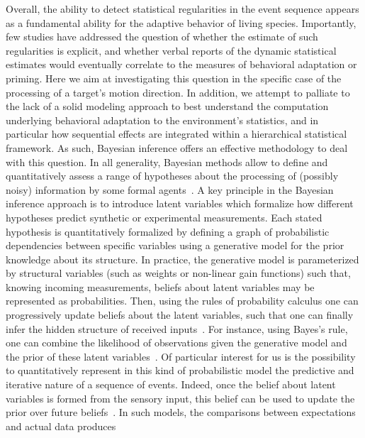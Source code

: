 \documentclass[12pt,english]{article}%
\newcommand{\citep}[1]{\parencite{#1}}
\begin{document}
Overall, the ability to detect
statistical regularities in the event sequence appears as a fundamental ability
for the adaptive behavior of living species.
Importantly, few studies have addressed the question of whether
the estimate of such regularities is explicit,
and whether verbal reports of the dynamic statistical
estimates would eventually correlate to the measures of behavioral adaptation or priming.
Here we aim at investigating this question
in the specific case of the  processing of a target's motion direction.
In addition, we attempt to palliate to the lack of a solid modeling approach
to best understand the computation underlying behavioral adaptation to the environment's statistics,
and in particular how sequential effects are integrated
within a hierarchical statistical framework.
As such, Bayesian inference offers an effective methodology
to deal with this question.
In all generality, Bayesian methods allow to define and quantitatively assess
a range of hypotheses about the processing of (possibly noisy) information by some formal agents~\citep{Deneve1999, Diaconescu2014, Daunizeau10a}.
A key principle in the Bayesian inference approach is
to introduce latent variables which formalize how different hypotheses predict synthetic or experimental measurements.
Each stated hypothesis is quantitatively formalized
by defining a graph of probabilistic dependencies between specific variables
using a generative model for the prior knowledge about its structure.
In practice, the generative model is parameterized by structural variables
(such as weights or non-linear gain functions)
such that, knowing incoming measurements, beliefs about latent variables
may be represented as probabilities.
Then, using the rules of probability calculus
one can progressively update beliefs about the latent variables,
such that one can finally infer the hidden structure of received inputs~\citep{Hoyer2003, Ma2014}.
For instance, using Bayes's rule, one can combine
the likelihood of observations given the generative model and
the prior of these latent variables~\citep{Janes2014}.
Of particular interest for us is the possibility to
quantitatively represent in this kind of probabilistic model
the predictive and iterative nature of a sequence of events.
Indeed, once the belief about latent variables
is formed from the sensory input,
this belief can be used to update
the prior over future beliefs~\citep{Montagnini2007}.
In such models, the comparisons between expectations and actual data produces
\end{document}

